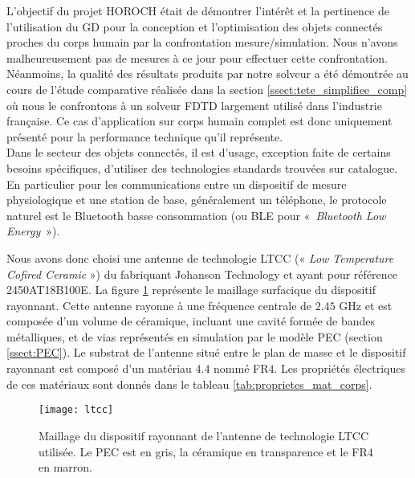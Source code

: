 L’objectif du projet HOROCH \cite{8094767,cem2018} était de démontrer l’intérêt
et la pertinence de l’utilisation du GD pour la
conception et l’optimisation des objets connectés proches
du corps humain par la confrontation mesure/simulation.
Nous n'avons malheureusement pas de mesures à ce jour pour effectuer cette
confrontation. Néanmoins, la qualité des résultats produits par
notre solveur a été démontrée au cours de l'étude comparative
réalisée dans la section \ref{ssect:tete_simplifiee_comp}
où nous le confrontons à un solveur FDTD largement utilisé
dans l'industrie française.
Ce cas d'application sur corps humain complet est donc uniquement présenté
pour la performance technique qu'il représente.
\\

Dans le secteur des objets connectés, il est d’usage,
exception faite de certains besoins spécifiques, d’utiliser
des technologies standards trouvées sur
catalogue. En particulier pour les communications entre
un dispositif de mesure physiologique et une station de
base, généralement un téléphone, le protocole naturel est
le Bluetooth basse consommation (ou BLE pour «~\textit{Bluetooth Low Energy}~»).


Nous avons
donc choisi une antenne de technologie LTCC (« \textit{Low
Temperature Cofired Ceramic} ») \cite{articleLTCC} du fabriquant
Johanson Technology
et ayant pour référence 2450AT18B100E.
La figure \ref{img:ltcc}
représente le maillage surfacique du dispositif rayonnant.
Cette antenne rayonne à une
fréquence centrale de $2.45$ GHz et est
composée d’un volume de céramique,
incluant une cavité
formée de bandes métalliques, et de vias représentés en simulation
par le modèle PEC (section \ref{ssect:PEC}).
Le substrat de l'antenne situé entre le plan de masse et le dispositif
rayonnant est composé d'un matériau $4.4$ nommé FR$4$.
Les propriétés électriques de ces matériaux sont donnés dans le tableau
\ref{tab:proprietes_mat_corps}.

\begin{figure}[!h]
	\centering
	\caption{
		\label{img:ltcc}
		Maillage du dispositif rayonnant de l'antenne de technologie LTCC utilisée.
		Le PEC est en gris, la céramique en transparence et le FR$4$ en marron.
	}
	\texttt{[image: ltcc]}
\end{figure}


